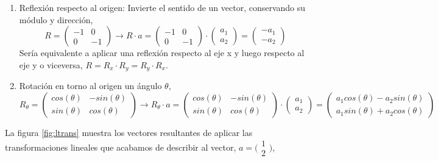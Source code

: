 \begin{enumerate}
\item Reflexión respecto al origen: Invierte el sentido de un vector, conservando su módulo y dirección,
\begin{equation*}
R=\begin{pmatrix}
-1& 0\\
0& -1
\end{pmatrix} \rightarrow R\cdot a = \begin{pmatrix}
-1& 0\\
0& -1
\end{pmatrix} \cdot \begin{pmatrix}
a_1\\
a_2
\end{pmatrix}= \begin{pmatrix}
-a_1\\
-a_2
\end{pmatrix}
\end{equation*}
Sería equivalente a aplicar una reflexión respecto al eje x y luego respecto al eje y o viceversa,
$R=R_x\cdot R_y= R_y\cdot R_x$.

\item Rotación en torno al origen un ángulo $\theta$,
\begin{equation*}
R_{\theta}=\begin{pmatrix}
cos(\theta)& -sin(\theta)\\
sin(\theta)& cos(\theta)
\end{pmatrix} \rightarrow R_{\theta}\cdot a = \begin{pmatrix}
cos(\theta)& -sin(\theta)\\
sin(\theta)& cos(\theta)
\end{pmatrix} \cdot \begin{pmatrix}
a_1\\
a_2
\end{pmatrix}= \begin{pmatrix}
a_1cos(\theta)-a_2sin(\theta)\\
a_1sin(\theta)+a_2cos(\theta)
\end{pmatrix}
\end{equation*}
\end{enumerate}

La figura \ref{fig:ltrans} muestra los vectores resultantes de aplicar las transformaciones lineales que acabamos de describir al vector,  $ a=\bigl( \begin{smallmatrix}
1\\
2
\end{smallmatrix} \bigr)$,

